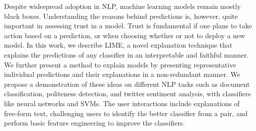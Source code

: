 Despite widespread adoption in NLP, machine learning models remain mostly black boxes. Understanding the reasons behind predictions is, however, quite important in assessing trust in a model. Trust is fundamental if one plans to take action based on a prediction, or when choosing whether or not to deploy a new model. In this work, we describe LIME, a novel explanation technique that explains the predictions of any classifier in an interpretable and faithful manner. We further present a method to explain models by presenting representative individual predictions and their explanations in a non-redundant manner. We propose a demonstration of these ideas on different NLP tasks such as document classification, politeness detection, and twitter sentiment analysis, with classifiers like neural networks and SVMs. The user interactions include explanations of free-form text, challenging users to identify the better classifier from a pair, and perform basic feature engineering to improve the classifiers.
